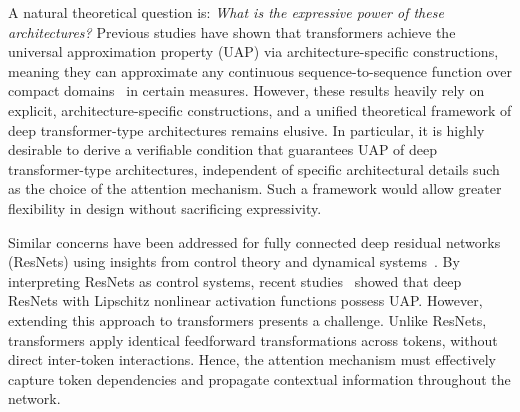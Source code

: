 \documentclass{article}
\newcommand{\cjp}[1]{{\footnotesize\textcolor{orange}{JC: #1}}}
\newcommand{\ql}[1]{{\footnotesize\textcolor{red}{QL: #1}}}
\begin{document}
A natural theoretical question is: \emph{What is the expressive power of these architectures?} 
Previous studies have shown that transformers achieve the universal approximation property (UAP) via architecture-specific constructions, meaning they can approximate any continuous sequence-to-sequence function over compact domains~\cite{yun2020n,zaheer2020big,kajitsukatransformers} in certain measures. 
However, these results heavily rely on explicit, architecture-specific constructions, and a unified theoretical framework of deep transformer-type architectures remains elusive.
In particular, it is highly desirable to derive a 
verifiable condition that guarantees UAP of deep transformer-type architectures,
independent of specific architectural details such as the choice of the attention mechanism.
Such a framework would allow greater flexibility in design without sacrificing expressivity.



Similar concerns have been addressed for fully connected deep residual networks (ResNets) using insights from control theory and dynamical systems~\cite{tabuada2022universal,ruiz2023neural,li2022deep,cheng2025interpolation}. By interpreting ResNets as control systems, recent studies~\cite{li2022deep,cheng2025interpolation} showed that deep ResNets with Lipschitz nonlinear activation functions possess UAP. However, extending this approach to transformers presents a challenge. Unlike ResNets, transformers apply identical feedforward transformations across tokens, without direct inter-token interactions. Hence, the attention mechanism must effectively capture token dependencies and propagate contextual information throughout the network.
\end{document}
